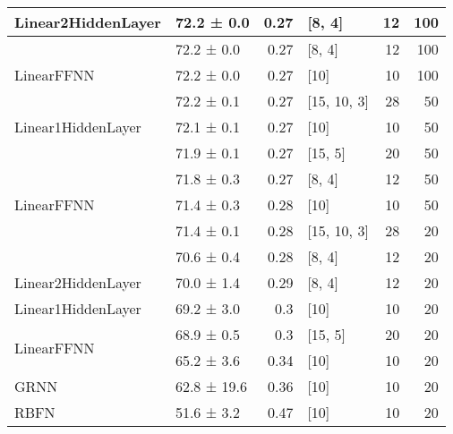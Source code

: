 \begin{longtable}{llrlrr}
 \hline
Linear2HiddenLayer                  & 72.2 ± 0.0  &  0.27 & [8, 4]         &         12 &      100 \\
 \hline
\multirow{3}{*}{LinearFFNN}         & 72.2 ± 0.0  &  0.27 & [8, 4]         &         12 &      100 \\
                                            & 72.2 ± 0.0  &  0.27 & [10]           &         10 &      100 \\
                                            & 72.2 ± 0.1  &  0.27 & [15, 10, 3]    &         28 &       50 \\
 \hline
Linear1HiddenLayer                  & 72.1 ± 0.1  &  0.27 & [10]           &         10 &       50 \\
 \hline
\multirow{5}{*}{LinearFFNN}         & 71.9 ± 0.1  &  0.27 & [15, 5]        &         20 &       50 \\
                                            & 71.8 ± 0.3  &  0.27 & [8, 4]         &         12 &       50 \\
                                            & 71.4 ± 0.3  &  0.28 & [10]           &         10 &       50 \\
                                            & 71.4 ± 0.1  &  0.28 & [15, 10, 3]    &         28 &       20 \\
                                            & 70.6 ± 0.4  &  0.28 & [8, 4]         &         12 &       20 \\
 \hline
Linear2HiddenLayer                  & 70.0 ± 1.4  &  0.29 & [8, 4]         &         12 &       20 \\
 \hline
Linear1HiddenLayer                  & 69.2 ± 3.0  &  0.3  & [10]           &         10 &       20 \\
 \hline
\multirow{2}{*}{LinearFFNN}         & 68.9 ± 0.5  &  0.3  & [15, 5]        &         20 &       20 \\
                                            & 65.2 ± 3.6  &  0.34 & [10]           &         10 &       20 \\
 \hline
GRNN                                & 62.8 ± 19.6 &  0.36 & [10]           &         10 &       20 \\
 \hline
RBFN                                & 51.6 ± 3.2  &  0.47 & [10]           &         10 &       20 \\
\hline
\end{longtable}
